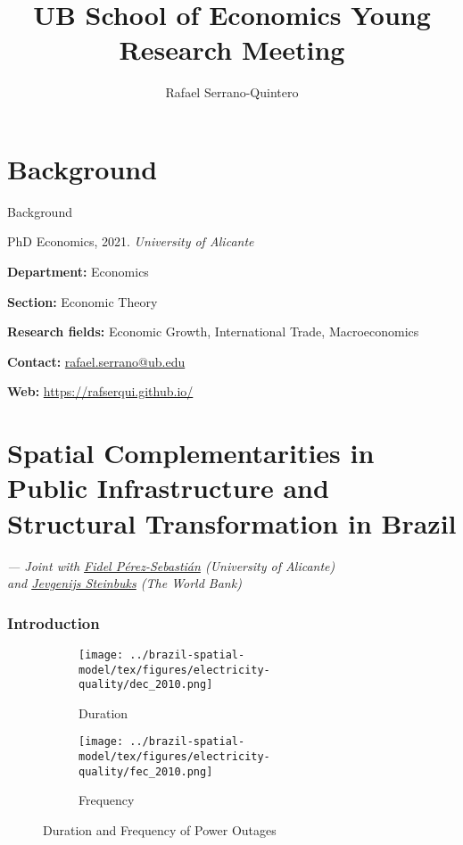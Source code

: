 \documentclass[11pt,xcolor={svgnames},aspectratio=169,usepdftitle=false]{beamer}
\title{UB School of Economics Young Research Meeting}
\author{Rafael Serrano-Quintero}
\date{}
\let\toneitemize\itemize
\let\ttwoitemize\enditemize
\renewenvironment{itemize}{\toneitemize\addtolength{\itemsep}{1.05\baselineskip}}{\ttwoitemize}
\begin{document}
\frame{\titlepage}

\section{Background}

\begin{frame}{Background}
    \begin{itemize}
        \item PhD Economics, 2021. \textit{University of Alicante}
        \item \alert{\textbf{Department:}} Economics
        \item \alert{\textbf{Section:}} Economic Theory
        \item \alert{\textbf{Research fields:}} Economic Growth, International Trade, Macroeconomics
        \item \alert{\textbf{Contact:}} \href{mailto:rafael.serrano@ub.edu}{rafael.serrano@ub.edu}
        \item \alert{\textbf{Web:}} \href{https://rafserqui.github.io/}{https://rafserqui.github.io/}
    \end{itemize}
\end{frame}

\section{Spatial Complementarities in Public Infrastructure and Structural Transformation in Brazil}
\begin{frame}{}{}
\sectionpage
\raggedleft \textit{--- Joint with \underline{Fidel P\'erez-Sebasti\'an}  (University of Alicante) \\ and \underline{Jevgenijs Steinbuks} (The World Bank)}
\end{frame}


\begin{frame}
    \frametitle{Introduction}
    \begin{figure}[htbp]
        \begin{subfigure}[b]{0.4875\linewidth}
            \centering
                \texttt{[image: ../brazil-spatial-model/tex/figures/electricity-quality/dec\_2010.png]}
                \caption{Duration}
                \label{fig:dec_2010}
        \end{subfigure}
        \begin{subfigure}[b]{0.4875\linewidth}
            \centering
                \texttt{[image: ../brazil-spatial-model/tex/figures/electricity-quality/fec\_2010.png]}
                \caption{Frequency}
                \label{fig:fec_2010}
        \end{subfigure}
        \caption{Duration and Frequency of Power Outages}
    \end{figure}
\end{frame}
\end{document}
